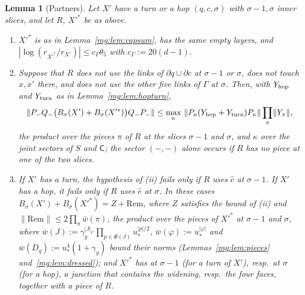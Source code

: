 \documentclass[11pt,a4paper]{article}
\newtheorem{lemma}[theorem]{Lemma}
\theoremstyle{definition}
\theoremstyle{remark}
\newcommand{\norm}[1]{\lVert #1\rVert}
\begin{document}
\begin{lemma}[Partners]\label{mg:lem:partners}
Let $X'$ have a turn or a hop $(q,c,\sigma)$ with $\sigma-1,\sigma$ inner slices, and let $R$, $X'^*$ be as above.
\begin{enumerate}[label=(\roman*)]
\item $X'^*$ is as in Lemma~\ref{mg:lem:capsum}, has the same empty layers, and $|\log(r_{X'^*}/r_{X'})|\le c_\Gamma\theta_5$ with $c_\Gamma:=20(d-1)$.
\item Suppose that $R$ does not use the links of $\partial q\cup\partial c$ at $\sigma-1$ or $\sigma$, does not touch $x,x'$ there, and does not use the other five links of
$\Gamma$ at $\sigma$. Then, with $Y_{\rm hop}$ and $Y_{\rm turn}$ as in Lemma~\ref{mg:lem:hopturn},
\[
\norm{P_-Q_-\bigl(B_\sigma(X')+B_\sigma(X'^*)\bigr)Q_-P_-}\le\max_{\kappa}\ \norm{P_\kappa(Y_{\rm hop}+Y_{\rm turn})P_\kappa}\prod_{\pi}\norm{Y_\pi},
\]
the product over the pieces $\pi$ of $R$ at the slices $\sigma-1$ and $\sigma$, and $\kappa$ over the joint sectors of $S$ and $\mathsf C$; the sector $(-,-)$ alone
occurs if $R$ has no piece at one of the two slices.
\item If $X'$ has a turn, the hypothesis of (ii) fails only if $R$ uses $\hat c$ at $\sigma-1$. If $X'$ has a hop, it fails only if $R$ uses $\hat e$ at $\sigma$. In these
cases $B_\sigma(X')+B_\sigma(X'^*)=Z+\mathrm{Rem}$, where $Z$ satisfies the bound of (ii) and $\norm{\mathrm{Rem}}\le2\prod_\pi\bar w(\pi)$, the product over the pieces of
$X'^*$ at $\sigma-1$ and $\sigma$, where $\bar w(J):=\gamma_g^{|J|_C}\prod_{p\in\Phi(J)}u_*^{|p|/2}$, $\bar w(\varphi):=u_*^{|\varphi|}$ and $\bar w(D_q):=u_*^4(1+\gamma_g)$ bound
their norms (Lemmas~\ref{mg:lem:pieces} and~\ref{mg:lem:dressed}); and $X'^*$ has at $\sigma-1$ (for a turn of $X'$), resp.\ at $\sigma$ (for a hop), a junction that contains the widening, resp.\ the four faces,
together with a piece of $R$.
\end{enumerate}
\end{lemma}
\end{document}

